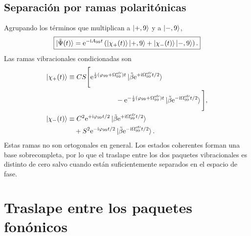 \documentclass[11pt]{article}
\newcommand{\ii}{\mathrm{i}}
\newcommand{\ee}{\mathrm{e}}
\begin{document}
\subsection{Separaci\'on por ramas polarit\'onicas}

Agrupando los t\'erminos que multiplican a $\ket{+,9}$ y a $\ket{-,9}$,
\begin{equation}
  \boxed{
  \ket{\tilde\Psi(t)}
  =
  \ee^{-\ii A_{99}t}
  \left(
  \ket{\chi_+(t)}\ket{+,9}
  +
  \ket{\chi_-(t)}\ket{-,9}
  \right).
  }
\end{equation}
Las ramas vibracionales condicionadas son
\begin{align}
  \ket{\chi_+(t)}
  &\equiv
  CS
  \Bigg[
  \ee^{\frac{\ii}{2}(\varphi_{99}+\Omega_{99}^{\mathrm{ef}\prime})t}
  \ket{\tilde\beta\ee^{+\ii\Omega_{99}^{\mathrm{ef}\prime}t/2}}
  \notag\\
  &\hspace{2.5cm}
  -
  \ee^{-\frac{\ii}{2}(\varphi_{99}+\Omega_{99}^{\mathrm{ef}\prime})t}
  \ket{\tilde\beta\ee^{-\ii\Omega_{99}^{\mathrm{ef}\prime}t/2}}
  \Bigg],
  \\
  \ket{\chi_-(t)}
  &\equiv
  C^2\ee^{+\ii\varphi_{99}t/2}
  \ket{\tilde\beta\ee^{+\ii\Omega_{99}^{\mathrm{ef}\prime}t/2}}
  \notag\\
  &\quad+
  S^2\ee^{-\ii\varphi_{99}t/2}
  \ket{\tilde\beta\ee^{-\ii\Omega_{99}^{\mathrm{ef}\prime}t/2}}.
\end{align}
Estas ramas no son ortogonales en general. Los estados coherentes forman una
base sobrecompleta, por lo que el traslape entre los dos paquetes vibracionales
es distinto de cero salvo cuando est\'an suficientemente separados en el
espacio de fase.

\section{Traslape entre los paquetes fon\'onicos}
\end{document}
